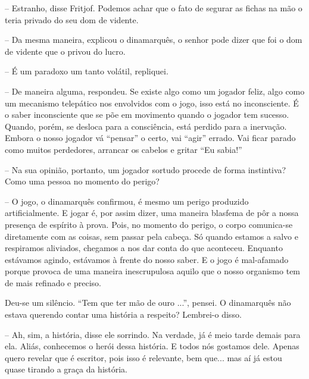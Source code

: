 -- Estranho, disse Fritjof. Podemos achar que o fato de segurar as
fichas na mão o teria privado do seu dom de vidente.

-- Da mesma maneira, explicou o dinamarquês, o senhor pode dizer que foi
o dom de vidente que o privou do lucro.

-- É um paradoxo um tanto volátil, repliquei.

-- De maneira alguma, respondeu. Se existe algo como um jogador feliz,
algo como um mecanismo telepático nos envolvidos com o jogo, isso está
no inconsciente. É o saber inconsciente que se põe em movimento quando o
jogador tem sucesso. Quando, porém, se desloca para a consciência, está
perdido para a inervação. Embora o nosso jogador vá ``pensar'' o certo,
vai ``agir'' errado. Vai ficar parado como muitos perdedores, arrancar
os cabelos e gritar ``Eu sabia!''

-- Na sua opinião, portanto, um jogador sortudo procede de forma
instintiva? Como uma pessoa no momento do perigo?

-- O jogo, o dinamarquês confirmou, é mesmo um perigo produzido
artificialmente. E jogar é, por assim dizer, uma maneira blasfema de pôr
a nossa presença de espírito à prova. Pois, no momento do perigo, o
corpo comunica-se diretamente com as coisas, sem passar pela cabeça. Só
quando estamos a salvo e respiramos aliviados, chegamos a nos dar conta
do que aconteceu. Enquanto estávamos agindo, estávamos à frente do nosso
saber. E o jogo é mal-afamado porque provoca de uma maneira
inescrupulosa aquilo que o nosso organismo tem de mais refinado e
preciso.

Deu-se um silêncio. ``Tem que ter mão de ouro ...'', pensei. O
dinamarquês não estava querendo contar uma história a respeito?
Lembrei-o disso.

-- Ah, sim, a história, disse ele sorrindo. Na verdade, já é meio tarde
demais para ela. Aliás, conhecemos o herói dessa história. E todos nós
gostamos dele. Apenas quero revelar que é escritor, pois isso é
relevante, bem que... mas aí já estou quase tirando a graça da história.

